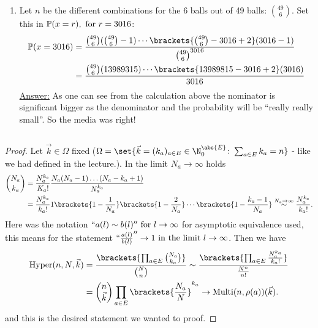 \begin{solution}
\begin{enumerate}[label=\alph*)]
\begin{enumerate}[label=\arabic*)]
		\end{enumerate}
	\item Let $n$ be the different combinations for the 6 balls out of 49 balls: $\binom{49}{6}$. Set this in $\mathbb{P}(x=r), \text{ for } r= 3016$:
	\begin{align*}
		\Meas(x = 3016) &= \frac{\binom{49}{6}(\binom{49}{6}-1)\cdots \brackets{\binom{49}{6} - 3016 + 2}(3016 -1)}{\binom{49}{6}^{3016}}\\
		&= \frac{\binom{49}{6}(13989315)\cdots \brackets{13989815 - 3016 + 2}(3016)}{3016}
	\end{align*}
	\ul{Answer:} As one can see from the calculation above the nominator is significant bigger as the denominator and the probability will be ``really really small''. So the media was right!
	\end{enumerate}
\end{solution}

\subsection{}

\begin{proof}
	Let $\vec{k} \in \Omega$ fixed ($\Omega = \set{\vec{k} = (k_a)_{a \in E} \in \N_0^{\abs{E}}\colon \sum_{a \in E} k_a = n}$ - like we had defined in the lecture.). In the limit $N_a \to \infty$ holds
	\begin{align*}
		\binom{N_a}{k_a} &= \frac{N_a^{k_a}}{K_a !} \frac{N_a(N_a -1)\dots (N_a - k_a +1)}{N_a^{k_a}}\\
		&= \frac{N_a^{k_a}}{k_a !} 1\brackets{1 - \frac{1}{N_a}}\brackets{1 - \frac{2}{N_a}}\cdots \brackets{1 - \frac{k_a -1}{N_a}} \overset{N_a \to \infty}{\sim} \frac{N_a^{k_a}}{k_a !}.
	\end{align*}
	Here was the notation $``a(l) \sim b(l)'' \text{ for } l \to \infty$ for asymptotic equivalence used, this means for the statement $``\frac{a(l)}{b(l)}'' \to 1 \text{ in the limit } l \to \infty$. Then we have
	\begin{align*}
		\Hyper(n,N,\vec{k}) 
		&= \frac{\brackets{\prod_{a \in E} 
		\binom{N_a}{k_a}}}{\binom{N}{n}}
		\sim \frac{
				   \brackets{
                             \prod_{a \in E} \frac{N_a^{k_a}}
                             {k_a !}
                         }}{\frac{N^n}{n!}}\\
		&= \binom{n}{\vec{k}} \prod_{a \in E} \brackets{\frac{N_a}{N}}^{k_a} \to \Multi(n,\rho(a))(\vec{k}).
	\end{align*} 
	and this is the desired statement we wanted to proof.
\end{proof}
